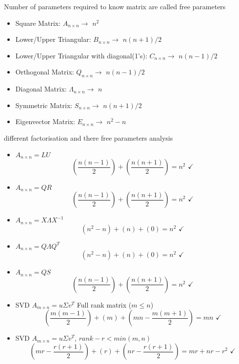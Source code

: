 \documentclass[a4paper]{article}
\numberwithin{equation}{section}
\begin{document}
\begin{itemize}
Number of parameters required to know matrix are called free parameters
\begin{itemize}
    \item Square Matrix: $A_{n\times n}\rightarrow$ $n^2$
    \item Lower/Upper Triangular: $B_{n\times n}\rightarrow$ $n(n+1)/2$
    \item Lower/Upper Triangular with diagonal(1's): $C_{n\times n}\rightarrow$ $n(n-1)/2$
    \item Orthogonal Matrix: $Q_{n\times n}\rightarrow$ $n(n-1)/2$
    \item Diagonal Matrix: $\varLambda_{n\times n}\rightarrow$ $n$
    \item Symmetric Matrix: $S_{n\times n} \rightarrow$ $n(n+1)/2$
    \item Eigenvector Matrix: $E_{n\times n} \rightarrow$ $n^2-n$
\end{itemize}

different factorisation and there free parameters analysis

\begin{itemize}
    \item $A_{n\times n}=LU$ 
    \[\left(\frac{n(n-1)}{2}\right)+\left(\frac{n(n+1)}{2}\right)=n^2 \hspace{4pt} \checkmark \] 
    \item $A_{n\times n}=QR$ 
    \[\left(\frac{n(n-1)}{2}\right)+\left(\frac{n(n+1)}{2}\right)=n^2 \hspace{4pt} \checkmark\]
    \item $A_{n\times n}=X\varLambda X^{-1}$ 
    \[(n^2-n)+(n)+(0)=n^2  \hspace{4pt} \checkmark\]
    \item $A_{n\times n}=Q\varLambda Q^T$
    \[(n^2-n)+(n)+(0)=n^2  \hspace{4pt} \checkmark\]
    \item $A_{n\times n}=QS$
    \[\left(\frac{n(n-1)}{2}\right)+\left(\frac{n(n+1)}{2}\right)=n^2 \hspace{4pt} \checkmark\]
    \item SVD $A_{m\times n}=u\Sigma v^T$  Full rank matrix ($m\leq n$)
    \[\left(\frac{m(m-1)}{2}\right)+(m)+\left(mn-\frac{m(m+1)}{2}\right)=mn  \hspace{4pt} \checkmark\]
    \item SVD $A_{m\times n}=u\Sigma v^T$,  $rank-r<min(m,n)$
    \[\left(mr-\frac{r(r+1)}{2}\right)+(r)+\left(nr-\frac{r(r+1)}{2}\right)=mr+nr-r^2  \hspace{4pt} \checkmark\]
\end{itemize}


\end{itemize}
\end{document}
